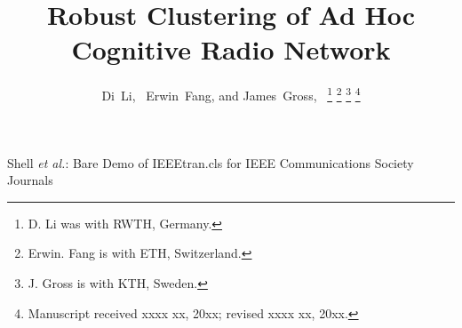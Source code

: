 \documentclass[journal,comsoc]{IEEEtran}
\theoremstyle{mytheoremstyle}
\theoremstyle{mytheoremstyle}
\theoremstyle{mytheoremstyle}
\begin{document}
%
\title{Robust Clustering of Ad Hoc Cognitive Radio Network}
%
%
%

\author{Di~Li,~
        Erwin~Fang,
        and James~Gross,~%
\thanks{D. Li was with RWTH, Germany.}%
\thanks{Erwin. Fang is with ETH, Switzerland.}%
\thanks{J. Gross is with KTH, Sweden.}%
\thanks{Manuscript received xxxx xx, 20xx; revised xxxx xx, 20xx.}}

% 
%



%
{Shell \MakeLowercase{\textit{et al.}}: Bare Demo of IEEEtran.cls for IEEE Communications Society Journals}
% 
\end{document}
